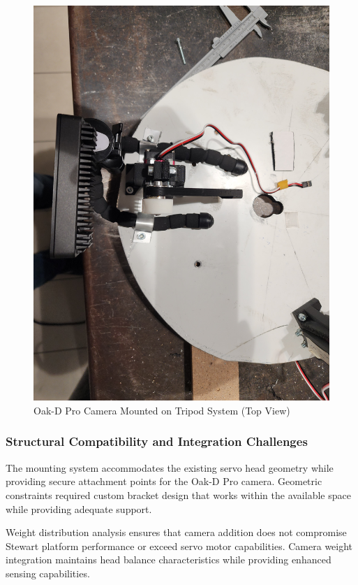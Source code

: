 \begin{figure}[H]
\begin{minipage}{0.45\textwidth}
        \includegraphics[width=\textwidth]{Images/TripodOnHeadCamera (2).jpg}
        \caption{Oak-D Pro Camera Mounted on Tripod System (Top View)}
        \label{fig:tripod_camera_mount_top}
    \end{minipage}
\end{figure}

\subsubsection{Structural Compatibility and Integration Challenges}

The mounting system accommodates the existing servo head geometry while providing secure attachment points for the Oak-D Pro camera. Geometric constraints required custom bracket design that works within the available space while providing adequate support.

Weight distribution analysis ensures that camera addition does not compromise Stewart platform performance or exceed servo motor capabilities. Camera weight integration maintains head balance characteristics while providing enhanced sensing capabilities.


